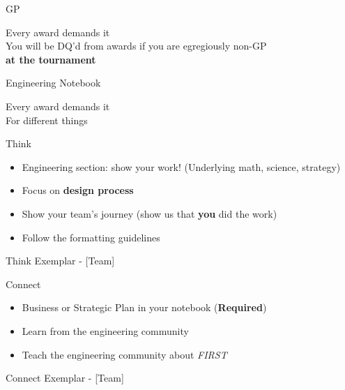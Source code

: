 \documentclass{beamer}
\begin{document}
  \begin{frame}{GP}
    \begin{center}
      \huge{Every award demands it}
      \\
      \pause
      \vspace{2em}
      \small{
        You will be DQ'd from awards if you are egregiously non-GP
        \\
        \textbf{at the tournament}
      }
    \end{center}
  \end{frame}

  \begin{frame}{Engineering Notebook}
    \begin{center}
      \huge{Every award demands it}
      \\
      \pause
      \vspace{2em}
      \small{For different things}
    \end{center}
  \end{frame}

  \begin{frame}{Think}
    \begin{itemize}
    \item Engineering section:
      show your work! (Underlying math, science, strategy) \pause
    \item Focus on \textbf{design process} \pause
    \item Show your team's journey
      (show us that \textbf{you} did the work) \pause
    \item Follow the formatting guidelines
    \end{itemize}
  \end{frame}

  \begin{frame}{Think Exemplar - [Team]}
  \end{frame}

  \begin{frame}{Connect}
    \begin{itemize}
    \item Business or Strategic Plan in your notebook (\textbf{Required})\pause
    \item Learn from the engineering community \pause
    \item Teach the engineering community about \textit{FIRST}
    \end{itemize}
  \end{frame}

  \begin{frame}{Connect Exemplar - [Team]}
  \end{frame}
\end{document}
